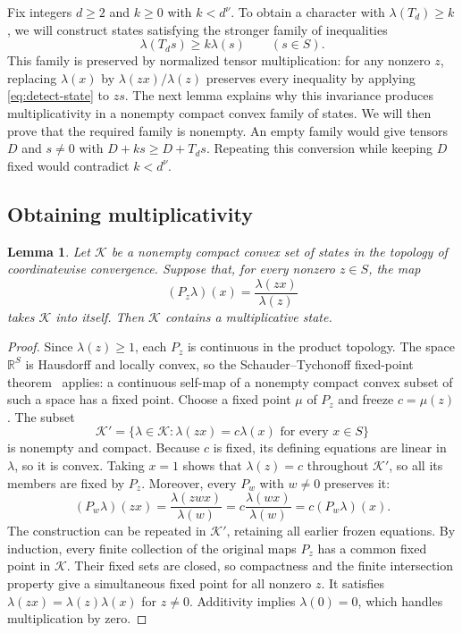 \documentclass[11pt]{article}
\newtheorem{lemma}[theorem]{Lemma}
\theoremstyle{definition}
\theoremstyle{remark}
\newcommand{\R}{\mathbb R}
\numberwithin{equation}{section}
\begin{document}
Fix integers $d\geq2$ and $k\geq0$ with $k<d^\nu$.
To obtain a character with $\lambda(T_d)\geq k$, we will construct
states satisfying the stronger family of inequalities
\begin{equation}\label{eq:detect-state}
 \lambda(T_ds)\geq k\lambda(s)\qquad(s\in S).
\end{equation}
This family is preserved by normalized tensor multiplication:
for any nonzero $z$, replacing $\lambda(x)$ by
$\lambda(zx)/\lambda(z)$ preserves every inequality by applying
\eqref{eq:detect-state} to $zs$.
The next lemma explains why this invariance produces multiplicativity
in a nonempty compact convex family of states.
We will then prove that the required family is nonempty. An empty
family would give tensors $D$ and $s\ne0$ with
$D+ks\geq D+T_ds$. Repeating this conversion while keeping $D$
fixed would contradict $k<d^\nu$.

\subsection{Obtaining multiplicativity}

\begin{lemma}\label{lem:multiplicativity}
Let $\mathcal K$ be a nonempty compact convex set of states in the
topology of coordinatewise convergence. Suppose that, for every
nonzero $z\in S$, the map
\[
 (P_z\lambda)(x)=\frac{\lambda(zx)}{\lambda(z)}
\]
takes $\mathcal K$ into itself. Then $\mathcal K$ contains a
multiplicative state.
\end{lemma}

\begin{proof}
Since $\lambda(z)\geq1$, each $P_z$ is continuous in the product
topology. The space $\R^S$ is Hausdorff and locally convex, so the
Schauder--Tychonoff fixed-point theorem~\cite{Tych35} applies: a
continuous self-map of a nonempty compact convex subset of such a
space has a fixed point. Choose a fixed point $\mu$ of $P_z$ and
freeze $c=\mu(z)$. The subset
\[
 \mathcal K'=
 \{\lambda\in\mathcal K:\lambda(zx)=c\lambda(x)
                  \text{ for every }x\in S\}
\]
is nonempty and compact. Because $c$ is fixed, its defining equations
are linear in $\lambda$, so it is convex. Taking $x=1$ shows that
$\lambda(z)=c$ throughout $\mathcal K'$, so all its members are
fixed by $P_z$. Moreover, every $P_w$ with $w\ne0$ preserves it:
\[
 (P_w\lambda)(zx)=\frac{\lambda(zwx)}{\lambda(w)}
                 =c\frac{\lambda(wx)}{\lambda(w)}
                 =c(P_w\lambda)(x).
\]
The construction can be repeated in $\mathcal K'$, retaining all
earlier frozen equations. By induction, every finite collection of
the original maps $P_z$ has a common fixed point in $\mathcal K$.
Their fixed sets are closed, so compactness and the finite
intersection property give a simultaneous fixed point for all
nonzero $z$. It satisfies
$\lambda(zx)=\lambda(z)\lambda(x)$ for $z\ne0$. Additivity implies
$\lambda(0)=0$, which handles multiplication by zero.
\end{proof}
\end{document}
